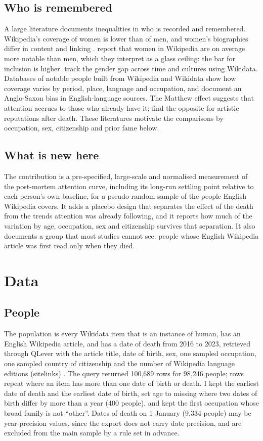 \documentclass[11pt,a4paper]{article}
\begin{document}
\subsection{Who is remembered}
A large literature documents inequalities in who is recorded and remembered. Wikipedia's coverage of women is lower than of men, and women's biographies differ in content and linking \citep{wagner2015,graellsgarrido2015,wagner2016}. \citet{wagner2016} report that women in Wikipedia are on average more notable than men, which they interpret as a glass ceiling: the bar for inclusion is higher. \citet{konieczny2018} track the gender gap across time and cultures using Wikidata. Databases of notable people built from Wikipedia and Wikidata \citep{yu2016,gergaud2016,laouenan2022} show how coverage varies by period, place, language and occupation, and \citet{laouenan2022} document an Anglo-Saxon bias in English-language sources. The Matthew effect \citep{merton1968} suggests that attention accrues to those who already have it; \citet{zhang2023} find the opposite for artistic reputations after death. These literatures motivate the comparisons by occupation, sex, citizenship and prior fame below.

\subsection{What is new here}
The contribution is a pre-specified, large-scale and normalised measurement of the post-mortem attention curve, including its long-run settling point relative to each person's own baseline, for a pseudo-random sample of the people English Wikipedia covers. It adds a placebo design that separates the effect of the death from the trends attention was already following, and it reports how much of the variation by age, occupation, sex and citizenship survives that separation. It also documents a group that most studies cannot see: people whose English Wikipedia article was first read only when they died.

\section{Data}\label{sec:data}
\subsection{People}
The population is every Wikidata item that is an instance of human, has an English Wikipedia article, and has a date of death from 2016 to 2023, retrieved through QLever with the article title, date of birth, sex, one sampled occupation, one sampled country of citizenship and the number of Wikipedia language editions (sitelinks) \citep{vrandecic2014}. The query returned 100,689 rows for 98,246 people; rows repeat where an item has more than one date of birth or death. I kept the earliest date of death and the earliest date of birth, set age to missing where two dates of birth differ by more than a year (400 people), and kept the first occupation whose broad family is not ``other''. Dates of death on 1 January (9,334 people) may be year-precision values, since the export does not carry date precision, and are excluded from the main sample by a rule set in advance.
\end{document}
